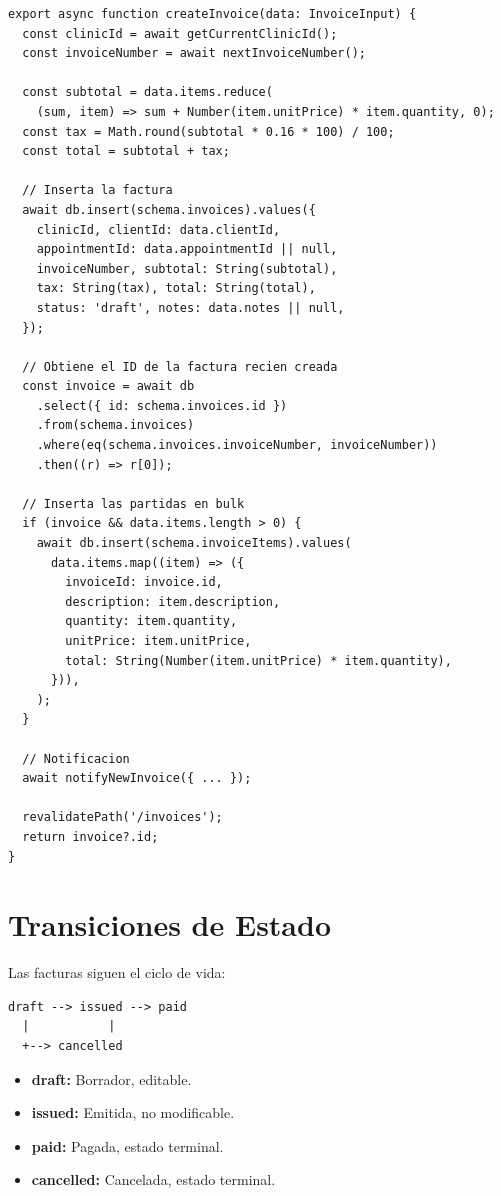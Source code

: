 \begin{lstlisting}[style=typescript, caption=createInvoice - Insercion de factura y partidas]
export async function createInvoice(data: InvoiceInput) {
  const clinicId = await getCurrentClinicId();
  const invoiceNumber = await nextInvoiceNumber();

  const subtotal = data.items.reduce(
    (sum, item) => sum + Number(item.unitPrice) * item.quantity, 0);
  const tax = Math.round(subtotal * 0.16 * 100) / 100;
  const total = subtotal + tax;

  // Inserta la factura
  await db.insert(schema.invoices).values({
    clinicId, clientId: data.clientId,
    appointmentId: data.appointmentId || null,
    invoiceNumber, subtotal: String(subtotal),
    tax: String(tax), total: String(total),
    status: 'draft', notes: data.notes || null,
  });

  // Obtiene el ID de la factura recien creada
  const invoice = await db
    .select({ id: schema.invoices.id })
    .from(schema.invoices)
    .where(eq(schema.invoices.invoiceNumber, invoiceNumber))
    .then((r) => r[0]);

  // Inserta las partidas en bulk
  if (invoice && data.items.length > 0) {
    await db.insert(schema.invoiceItems).values(
      data.items.map((item) => ({
        invoiceId: invoice.id,
        description: item.description,
        quantity: item.quantity,
        unitPrice: item.unitPrice,
        total: String(Number(item.unitPrice) * item.quantity),
      })),
    );
  }

  // Notificacion
  await notifyNewInvoice({ ... });

  revalidatePath('/invoices');
  return invoice?.id;
}
\end{lstlisting}

\section{Transiciones de Estado}

Las facturas siguen el ciclo de vida:

\begin{verbatim}
draft --> issued --> paid
  |           |
  +--> cancelled
\end{verbatim}

\begin{itemize}[leftmargin=*]
    \item \textbf{draft:} Borrador, editable.
    \item \textbf{issued:} Emitida, no modificable.
    \item \textbf{paid:} Pagada, estado terminal.
    \item \textbf{cancelled:} Cancelada, estado terminal.
\end{itemize}

